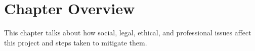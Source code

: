\section{Chapter Overview}

This chapter talks about how social, legal, ethical, and professional issues affect this project and steps taken to mitigate them.